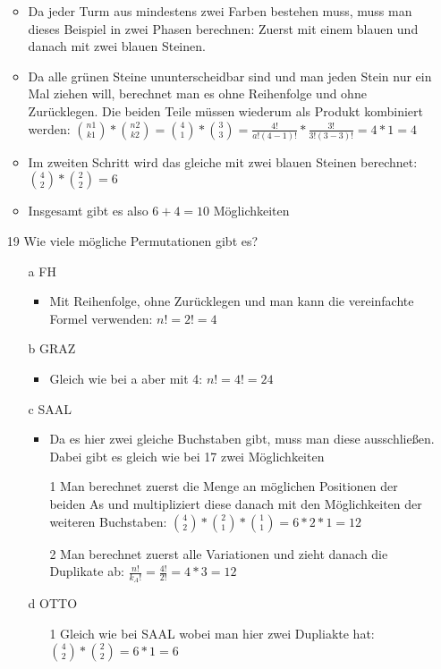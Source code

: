 \documentclass{article}
\begin{document}
\begin{itemize}
\begin{itemize}
			\item{Da jeder Turm aus mindestens zwei Farben bestehen muss, muss man dieses Beispiel in zwei Phasen berechnen: Zuerst mit einem blauen und danach mit zwei blauen Steinen.}
			\item{Da alle grünen Steine ununterscheidbar sind und man jeden Stein nur ein Mal ziehen will, berechnet man es ohne Reihenfolge und ohne Zurücklegen. Die beiden Teile müssen wiederum als Produkt kombiniert werden: $\binom{n1}{k1}*\binom{n2}{k2}=\binom{4}{1}*\binom{3}{3}=\frac{4!}{a!(4-1)!}*\frac{3!}{3!(3-3)!}=4*1=4$}
			\item{Im zweiten Schritt wird das gleiche mit zwei blauen Steinen berechnet: $\binom{4}{2}*\binom{2}{2}=6$}
			\item{Insgesamt gibt es also $6+4=10$ Möglichkeiten}
		\end{itemize}
		\item[19]{Wie viele mögliche Permutationen gibt es?}
		\begin{itemize}
			\item[a]{FH}
			\begin{itemize}
				\item{Mit Reihenfolge, ohne Zurücklegen und man kann die vereinfachte Formel verwenden: $n!=2!=4$}
			\end{itemize}
			\item[b]{GRAZ}
			\begin{itemize}
				\item{Gleich wie bei a aber mit 4: $n!=4!=24$}
			\end{itemize}
			\item[c]{SAAL}
			\begin{itemize}
				\item{Da es hier zwei gleiche Buchstaben gibt, muss man diese ausschließen. Dabei gibt es gleich wie bei 17 zwei Möglichkeiten}
				\item[1]{Man berechnet zuerst die Menge an möglichen Positionen der beiden As und multipliziert diese danach mit den Möglichkeiten der weiteren Buchstaben: $\binom{4}{2}*\binom{2}{1}*\binom{1}{1}=6*2*1=12$}
				\item[2]{Man berechnet zuerst alle Variationen und zieht danach die Duplikate ab: $\frac{n!}{k_A!}=\frac{4!}{2!}=4*3=12$}
			\end{itemize}
			\item[d]{OTTO}
			\begin{itemize}
				\item[1]{Gleich wie bei SAAL wobei man hier zwei Dupliakte hat: $\binom{4}{2}*\binom{2}{2}=6*1=6$}

\end{itemize}
\end{itemize}
\end{itemize}
\end{document}
